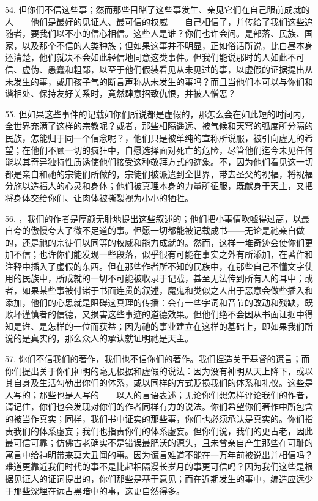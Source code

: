 54. 但你们不信这些事；然而那些目睹了这些事发生、亲见它们在自己眼前成就的人——他们是最好的见证人、最可信的权威——自己相信了，并传给了我们这些追随者，要我们以不小的信心相信。这些人是谁？你们也许会问。是部落、民族、国家，以及那个不信的人类种族；但如果这事并不明显，正如俗话所说，比白昼本身还清楚，他们就决不会如此轻信地同意这类事件。但我们能说那时的人如此不可信、虚伪、愚蠢和粗鄙，以至于他们假装看见从未见过的事，以虚假的证据提出从未发生的事，或用孩子气的断言声称从未发生的事吗？而且当他们本可以与你们和谐相处、保持友好关系时，竟然肆意招致仇恨，并被人憎恶？\par

55. 但如果这些事件的记载如你们所说都是虚假的，那怎么会在如此短的时间内，全世界充满了这样的宗教呢？或者，那些相隔遥远、被气候和天穹的弧度所分隔的民族，怎能归于同一个信念呢？，他们只是被单纯的宣称所说服，被引向虚无的希望；在他们不顾一切的疯狂中，自愿选择面对死亡的危险，尽管他们迄今未见任何能以其奇异独特性质诱使他们接受这种敬拜方式的迹象。不，因为他们看见这一切都是亲自和祂的宗徒们所做的，宗徒们被派遣到全世界，带去圣父的祝福，将祝福分施以造福人的心灵和身体；他们被真理本身的力量所征服，既献身于天主，又把将身体交给你们、让肉体被撕裂视为小小的牺牲。\par

56. ，我们的作者是厚颜无耻地提出这些叙述的；他们把小事情吹嘘得过高，以最自夸的傲慢夸大了微不足道的事。但愿一切都能被记载成书——无论是祂亲自做的，还是祂的宗徒们以同等的权威和能力成就的。然而，这样一堆奇迹会使你们更加不信；也许你们能发现一些段落，似乎很有可能在事实之外有所添加，在著作和注释中插入了虚假的东西。但在那些作者所不知的民族中，在那些自己不懂文字使用的民族中，所成就的一切不可能被收录于记载，甚至无法传到所有人的耳中；或者，如果某些事被付诸于书面连贯的叙述，魔鬼和类似之人出于恶意会做些插入和添加，他们的心思就是阻碍这真理的传播：会有一些字词和音节的改动和残缺，既败坏谨慎者的信德，又损害这些事迹的道德效果。但他们绝不会因从书面证据中得知是谁、是怎样的一位而获益；因为祂的事业建立在这样的基础上，即如果我们所说的是真实的，那么众人的承认就证明祂是天主。\par

57. 你们不信我们的著作，我们也不信你们的著作。我们捏造关于基督的谎言；而你们提出关于你们神明的毫无根据和虚假的说法：因为没有神明从天上降下，或以其自身及生活勾勒出你们的体系，或以同样的方式贬损我们的体系和礼仪。这些是人写的；那些也是人写的——以人的言语表述；无论你们想怎样评论我们的作者，请记住，你们也会发现对你们的作者同样有力的说法。你们希望你们著作中所包含的被当作真实；同样，我们书中证实的那些事，你们也必须承认是真实的。你们指责我们的体系虚妄；我们也指责你们的体系虚妄。但你们说，我们的更古老，因此最可信可靠；仿佛古老确实不是错误最肥沃的源头，且未曾亲自产生那些在可耻的寓言中给神明带来莫大丑闻的事。因为谎言难道不能在一万年前被说出并相信吗？难道更靠近我们时代的事不是比起相隔漫长岁月的事更可信吗？因为我们这些是根据见证人的证词提出的，你们那些是基于意见；而在近期发生的事中，编造应远少于那些深埋在远古黑暗中的事，这更自然得多。\par

